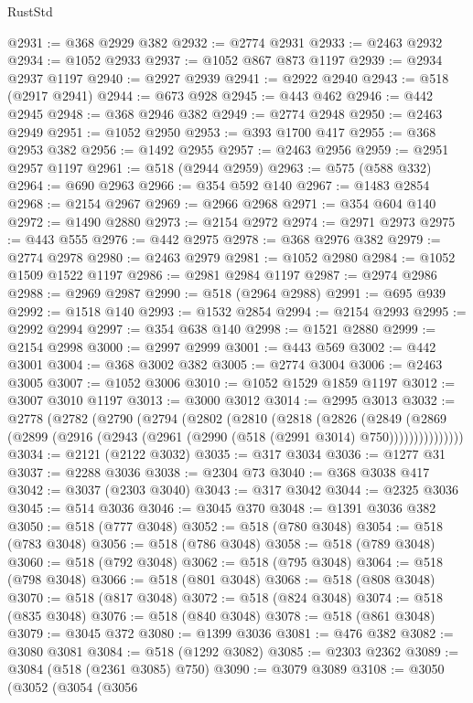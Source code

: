 \begin{lexlean}{RustStd}
\begin{coremodule}
@2931 := @368 @2929 @382
@2932 := @2774 @2931
@2933 := @2463 @2932
@2934 := @1052 @2933
@2937 := @1052 @867 @873 @1197
@2939 := @2934 @2937 @1197
@2940 := @2927 @2939
@2941 := @2922 @2940
@2943 := @518 (@2917 @2941)
@2944 := @673 @928
@2945 := @443 @462
@2946 := @442 @2945
@2948 := @368 @2946 @382
@2949 := @2774 @2948
@2950 := @2463 @2949
@2951 := @1052 @2950
@2953 := @393 @1700 @417
@2955 := @368 @2953 @382
@2956 := @1492 @2955
@2957 := @2463 @2956
@2959 := @2951 @2957 @1197
@2961 := @518 (@2944 @2959)
@2963 := @575 (@588 @332)
@2964 := @690 @2963
@2966 := @354 @592 @140
@2967 := @1483 @2854
@2968 := @2154 @2967
@2969 := @2966 @2968
@2971 := @354 @604 @140
@2972 := @1490 @2880
@2973 := @2154 @2972
@2974 := @2971 @2973
@2975 := @443 @555
@2976 := @442 @2975
@2978 := @368 @2976 @382
@2979 := @2774 @2978
@2980 := @2463 @2979
@2981 := @1052 @2980
@2984 := @1052 @1509 @1522 @1197
@2986 := @2981 @2984 @1197
@2987 := @2974 @2986
@2988 := @2969 @2987
@2990 := @518 (@2964 @2988)
@2991 := @695 @939
@2992 := @1518 @140
@2993 := @1532 @2854
@2994 := @2154 @2993
@2995 := @2992 @2994
@2997 := @354 @638 @140
@2998 := @1521 @2880
@2999 := @2154 @2998
@3000 := @2997 @2999
@3001 := @443 @569
@3002 := @442 @3001
@3004 := @368 @3002 @382
@3005 := @2774 @3004
@3006 := @2463 @3005
@3007 := @1052 @3006
@3010 := @1052 @1529 @1859 @1197
@3012 := @3007 @3010 @1197
@3013 := @3000 @3012
@3014 := @2995 @3013
@3032 := @2778
    (@2782
      (@2790
        (@2794
          (@2802
            (@2810
              (@2818
                (@2826
                  (@2849
                    (@2869
                      (@2899 (@2916 (@2943 (@2961 (@2990 (@518 (@2991 @3014) @750)))))))))))))))
@3034 := @2121 (@2122 @3032)
@3035 := @317 @3034
@3036 := @1277 @31
@3037 := @2288 @3036
@3038 := @2304 @73
@3040 := @368 @3038 @417
@3042 := @3037 (@2303 @3040)
@3043 := @317 @3042
@3044 := @2325 @3036
@3045 := @514 @3036
@3046 := @3045 @370
@3048 := @1391 @3036 @382
@3050 := @518 (@777 @3048)
@3052 := @518 (@780 @3048)
@3054 := @518 (@783 @3048)
@3056 := @518 (@786 @3048)
@3058 := @518 (@789 @3048)
@3060 := @518 (@792 @3048)
@3062 := @518 (@795 @3048)
@3064 := @518 (@798 @3048)
@3066 := @518 (@801 @3048)
@3068 := @518 (@808 @3048)
@3070 := @518 (@817 @3048)
@3072 := @518 (@824 @3048)
@3074 := @518 (@835 @3048)
@3076 := @518 (@840 @3048)
@3078 := @518 (@861 @3048)
@3079 := @3045 @372
@3080 := @1399 @3036
@3081 := @476 @382
@3082 := @3080 @3081
@3084 := @518 (@1292 @3082)
@3085 := @2303 @2362
@3089 := @3084 (@518 (@2361 @3085) @750)
@3090 := @3079 @3089
@3108 := @3050
    (@3052
      (@3054
        (@3056

\end{coremodule}
\end{lexlean}
